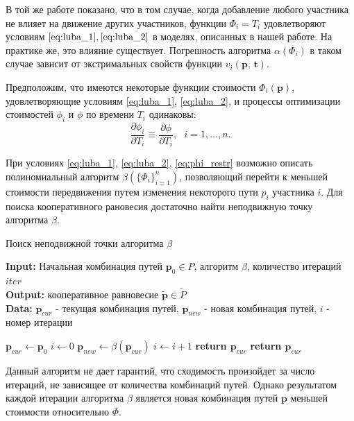 \documentclass[12pt, a4paper]{article}
\begin{document}
В той же работе показано, что в том случае, когда добавление любого участника не влияет на движение других участников, функции $\Phi_i = T_i$ удовлетворяют условиям  $\eqref{eq:luba_1}, \eqref{eq:luba_2}$ в моделях, описанных в нашей работе. На практике же, это влияние существует. Погрешность алгоритма $\alpha (\Phi_i)$ в таком случае зависит от экстримальных свойств функции $v_i (\textbf{p, t})$.

Предположим, что имеются некоторые функции стоимости $\Phi_i (\textbf{p})$, удовлетворяющие условиям \eqref{eq:luba_1}, \eqref{eq:luba_2}, и процессы оптимизации стоимостей $\phi_i$ и $\phi$ по времени $T_i$ одинаковы:
\begin{equation}
	\label{eq:phi_restr}
	\frac{\partial \phi_i}{\partial T_i} \equiv \frac{\partial \phi}{\partial T_i}, \text{ } i = 1, \ldots, n.
\end{equation}

При условиях \eqref{eq:luba_1}, \eqref{eq:luba_2}, \eqref{eq:phi_restr} возможно описать полиномиальный алгоритм $\beta(\{\Phi_i\}_{i = 1}^n)$, позволяющий перейти к меньшей стоимости передвижения путем изменения некоторого пути  $p_i$ участника $i$. Для поиска кооперативного рановесия достаточно найти неподвижную точку алгоритма $\beta$. 

\begin{algorithm}[H]
	\caption{Поиск неподвижной точки алгоритма $\beta$}
	\label{alg:coop_find1}
	{\bf {Input:}} Начальная комбинация путей $\textbf{p}_0 \in P$, алгоритм $\beta$, количество итераций $iter$\\
	{\bf {Output:}} кооперативное равновесие $\widetilde{\textbf{p}} \in \widetilde{P}$\\
	{\bf {Data:}} $\textbf{p}_{cur}$ - текущая комбинация путей, $\textbf{p}_{new}$ - новая комбинация путей, $i$ - номер итерации
	\begin{algorithmic}[1]
		\State $\textbf{p}_{cur} \gets \textbf{p}_0$
		\State $i \gets 0$
		\State $\textbf{p}_{new} \gets \beta (\textbf{p}_{cur}) $
		\State $i \gets i + 1$
			\State \textbf{return $\textbf{p}_{cur}$}
		\EndIf
		\EndWhile
	\State \textbf{return $\textbf{p}_{cur}$}
	\end{algorithmic}
\end{algorithm}

Данный алгоритм не дает гарантий, что сходимость произойдет за число итераций, не зависящее от количества комбинаций путей. Однако результатом каждой итерации алгоритма $\beta$ является новая комбинация путей $\textbf{p}$ меньшей стоимости относительно $\Phi$. 
\end{document}
